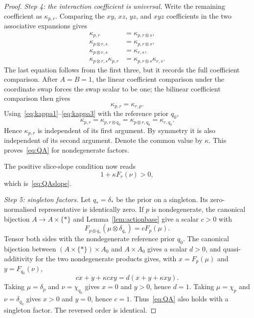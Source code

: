 \documentclass[11pt,a4paper]{article}
\theoremstyle{definition}
\newcommand{\1}{\mathbf 1}
\begin{document}
\begin{proof}
\emph{Step 4: the interaction coefficient is universal.}
Write the remaining coefficient as $\kappa_{p,r}$.  Comparing the $xy$, $xz$, $yz$, and $xyz$ coefficients in the two
associative expansions gives
\begin{align}
\kappa_{p,r}&=\kappa_{p,r\otimes s}, \tag{K1}\label{eq:kappa1}\\
\kappa_{p\otimes r,s}&=\kappa_{p,r\otimes s}, \tag{K2}\label{eq:kappa2}\\
\kappa_{p\otimes r,s}&=\kappa_{r,s}, \tag{K3}\label{eq:kappa3}\\
\kappa_{p\otimes r,s}\kappa_{p,r}&=\kappa_{p,r\otimes s}\kappa_{r,s}. \tag{K4}\label{eq:kappa4}
\end{align}
The last equation follows from the first three, but it records the full coefficient comparison.  After $A=B=1$, the
linear coefficient comparison under the coordinate swap forces the swap scalar to be one; the bilinear coefficient
comparison then gives
\begin{equation}
\kappa_{p,r}=\kappa_{r,p}.
\tag{KS}\label{eq:kappasym}
\end{equation}
Using~\eqref{eq:kappa1}--\eqref{eq:kappa3} with the reference prior $q_0$,
\[
\kappa_{p,r}
=\kappa_{p,r\otimes q_0}
=\kappa_{p\otimes r,q_0}
=\kappa_{r,q_0}.
\]
Hence $\kappa_{p,r}$ is independent of its first argument.  By symmetry it is also independent of its second argument.
Denote the common value by $\kappa$.  This proves~\eqref{eq:QA} for nondegenerate factors.

The positive slice-slope condition now reads
\[
1+\kappa F_r(\nu)>0,
\]
which is~\eqref{eq:QAslope}.

\emph{Step 5: singleton factors.}
Let $q_*=\delta_*$ be the prior on a singleton.  Its zero-normalised representative is identically zero.  If $p$ is
nondegenerate, the canonical bijection $A\to A\times\{*\}$ and Lemma~\ref{lem:actionbase} give a scalar $c>0$ with
\[
F_{p\otimes q_*}(\mu\otimes\delta_{q_*})=cF_p(\mu).
\]
Tensor both sides with the nondegenerate reference prior $q_0$.  The canonical bijection between
$(A\times\{*\})\times A_0$ and $A\times A_0$ gives a scalar $d>0$, and quasi-additivity for the two nondegenerate
products gives, with $x=F_p(\mu)$ and $y=F_{q_0}(\nu)$,
\[
cx+y+\kappa cxy=d(x+y+\kappa xy).
\]
Taking $\mu=\delta_p$ and $\nu=\chi_{q_0}$ gives $x=0$ and $y>0$, hence $d=1$.  Taking
$\mu=\chi_p$ and $\nu=\delta_{q_0}$ gives $x>0$ and $y=0$, hence $c=1$.  Thus~\eqref{eq:QA} also holds with a singleton
factor.  The reversed order is identical.
\end{proof}
\end{document}
